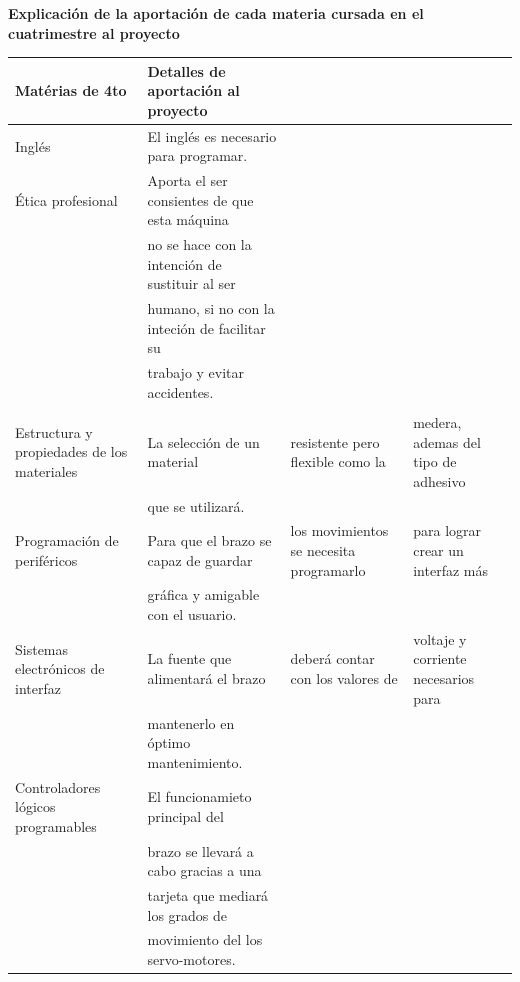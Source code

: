 \documentclass[letterpaper]{article}
\begin{document}
\newpage
\begin{large}
\textbf{Explicación de la aportación  de cada materia cursada en el cuatrimestre al proyecto}
\begin{table}[]
    \centering
    \begin{tabular}{|l|l|}
    \hline
Matérias de 4to  &  Detalles de aportación al proyecto 
                        \\ \hline
Inglés & El inglés es necesario para programar.
                        \\ \hline
Ética profesional & Aporta el ser consientes de que esta máquina \\
                  & no se hace con la intención de sustituir al ser\\
                  & humano, si no con la inteción de facilitar su\\ 
                  & trabajo y evitar accidentes. \\
                        \\\hline
Estructura y propiedades de los materiales & La selección de un material
                                 & resistente pero flexible como la
                                 & medera, ademas del tipo de adhesivo\\
                                 & que se utilizará.
                        \\\hline
Programación de periféricos & Para que el brazo se capaz de guardar
                            & los movimientos se necesita programarlo
                            & para lograr crear un interfaz más\\
                            & gráfica y amigable con el usuario.
                        \\\hline
Sistemas electrónicos de interfaz & La fuente que alimentará el brazo
                                 &deberá contar con los valores de
                                 & voltaje y corriente necesarios para\\
                                 & mantenerlo en óptimo mantenimiento.
                        \\\hline
Controladores lógicos programables & El funcionamieto principal del\\
                                &brazo se llevará a cabo gracias a una\\
                                & tarjeta que mediará los grados de\\
                                & movimiento del los servo-motores.\\
                                \hline
        
    \end{tabular}
\end{table}

\end{large}

\begin{large}
    \begin{LARGE}
        
    \end{LARGE}
\end{large}

\begin{thebibliography}{}
\bibitem{}

\end{thebibliography}










 
\end{document}
